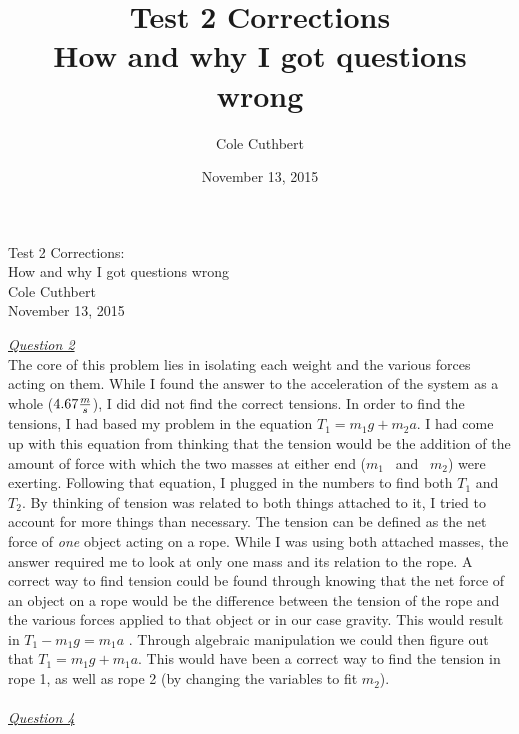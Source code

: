 \documentclass[12pt]{article}
\title{Test 2 Corrections\\ 
\large How and why I got questions wrong}
\author{Cole Cuthbert}
\date{November 13, 2015}
\begin{document}
\doublespacing
  \begin{titlepage}
    \vspace*{\fill}
    \begin{center}
      \Huge Test 2 Corrections: \\
      \Large How and why I got questions wrong \\
      \large Cole Cuthbert \\
      \large November 13, 2015
    \end{center}
    \vspace*{\fill}
  \end{titlepage}


\noindent \underline{\textit{Question 2}}
\\ 
\indent 
	The core of this problem lies in isolating each weight and the various forces acting on them. While I found the answer to the acceleration of the system as a whole (${4.67}{m \over s}$), I did did not find the correct tensions. In order to find the tensions, I had based my problem in the equation $T_1=m_1g+m_2a$. I had come up with this equation from thinking that the tension would be the addition of the amount of force with which the two masses at either end ($m_1$ \ and \ $m_2$) were exerting. Following that equation, I plugged in the numbers to find both $T_1$ and $T_2$. By thinking of tension was related to both things attached to it, I tried to account for more things than necessary. The tension can be defined as the net force of \emph{one} object acting on a rope. While I was using both attached masses, the answer required me to look at only one mass and its relation to the rope. A correct way to find tension could be found through knowing that the net force of an object on a rope would be the difference between the tension of the rope and the various forces applied to that object or in our case gravity. This would result in $T_1-m_1g=m_1a$ . Through algebraic manipulation we could then figure out that $T_1=m_1g+m_1a$. This would have been a correct way to find the tension in rope 1, as well as rope 2 (by changing the variables to fit $m_2$).
\\\\
\noindent \underline{\textit{Question 4}}
\\
\indent 
\end{document}
